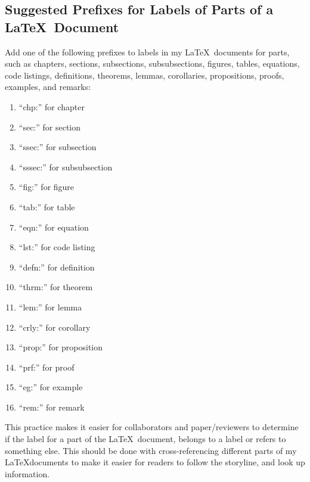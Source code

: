 \documentclass[letter,12pt]{article}
\begin{document}
\subsection{Suggested Prefixes for Labels of Parts of a \LaTeX\ Document}
\label{ssec:SuggestedPrefixesForLabelsOfPartsOfALaTeXDocument}



Add one of the following prefixes to labels in my \LaTeX\ documents for parts, such as chapters, sections, subsections, subsubsections, figures, tables, equations, code listings, definitions, theorems, lemmas, corollaries, propositions, proofs, examples, and remarks: \vspace{-0.3cm}
\begin{enumerate} \itemsep -4pt
\item ``chp:'' for chapter
\item ``sec:'' for section
\item ``ssec:'' for subsection
\item ``sssec:'' for subsubsection
\item ``fig:'' for figure
\item ``tab:'' for table
\item ``eqn:'' for equation
\item ``lst:'' for code listing
\item ``defn:'' for definition
\item ``thrm:'' for theorem
\item ``lem:'' for lemma
\item ``crly:'' for corollary
\item ``prop:'' for proposition
\item ``prf:'' for proof
\item ``eg:'' for example
\item ``rem:'' for remark
\end{enumerate}


This practice makes it easier for collaborators and paper/reviewers to determine if the label for a part of the \LaTeX\ document, belongs to a label or refers to something else. This should be done with cross-referencing different parts of my \LaTeX documents to make it easier for readers to follow the storyline, and look up information.
\end{document}
